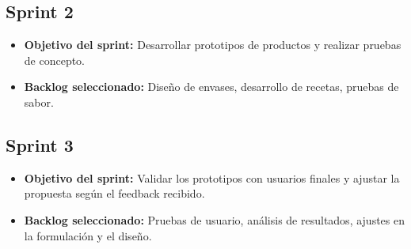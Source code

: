 \documentclass{article}
\begin{document}
\subsection{Sprint 2}
\begin{itemize}
\item \textbf{Objetivo del sprint:} Desarrollar prototipos de productos y realizar pruebas de concepto.
\item \textbf{Backlog seleccionado:} Diseño de envases, desarrollo de recetas, pruebas de sabor.
\end{itemize}


\subsection{Sprint 3}
\begin{itemize}
\item \textbf{Objetivo del sprint:} Validar los prototipos con usuarios finales y ajustar la propuesta según el feedback recibido.
\item \textbf{Backlog seleccionado:} Pruebas de usuario, análisis de resultados, ajustes en la formulación y el diseño.
\end{itemize}
\end{document}
